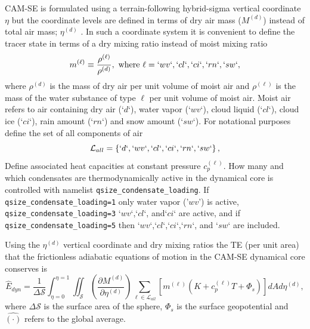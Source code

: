 \documentclass{agujournal}
\newcommand*{\gi}[1]{\widehat{#1}}
\begin{document}
CAM-SE is formulated using a terrain-following hybrid-sigma vertical coordinate $\eta$ but the coordinate levels are defined in terms of dry air mass ($M^{(d)}$) instead of total air mass; $\eta^{(d)}$ \citep[see ][ for details]{LetAl2018JAMES}. In such a coordinate system it is convenient to define the tracer state in terms of a dry mixing ratio instead of moist mixing ratio
\begin{equation}
m^{(\ell)}\equiv \frac{\rho^{(\ell)}}{\rho^{(d)}}, \text{ where }\ell=`wv`,`cl`,`ci`,`rn`,`sw`,\label{eq:mx}
\end{equation}
where $\rho^{(d)}$ is the mass of dry air per unit volume of moist air and $\rho^{(\ell)}$ is the mass of the water substance of type $\ell$ per unit volume of moist air. Moist air refers to air containing dry air (`$d$`), water vapor (`$wv$`), cloud liquid (`$cl$`), cloud ice (`$ci$`), rain amount (`$rn$`) and snow amount (`$sw$`). For notational purposes define the set of all components of air
\begin{equation}
\mathcal{L}_{all}=\left\{ `d`,`wv`,`cl`,`ci`,`rn`,`sw`\right\},
\end{equation}
Define associated heat capacities at constant pressure $c_p^{(\ell)}$. How many and which condensates are thermodynamically active in the dynamical core is controlled with namelist {\tt{qsize\_condensate\_loading}}. If {\tt{qsize\_condensate\_loading=1}} only water vapor ('$wv$') is active, {\tt{qsize\_condensate\_loading=3}} `$wv$`,`$cl$`, and`$ci$` are active, and if {\tt{qsize\_condensate\_loading=5}} then `$wv$`,`$cl$`,`$ci$`,`$rn$`, and `$sw$` are included.

Using the $\eta^{(d)}$ vertical coordinate and dry mixing ratios the TE (per unit area) that the frictionless adiabatic equations of motion in the CAM-SE dynamical core conserves is
\begin{equation}
\gi{E}_{dyn}=\frac{1}{\Delta \mathcal{S}}\int_{\eta=0}^{\eta=1} \iint_\mathcal{S} \left( \frac{\partial M^{(d)}}{\partial \eta^{(d)}} \right)\sum_{\ell \in \mathcal{L}_{all}} \left[m^{(\ell)} \left(K+c_p^{(\ell)}T+\Phi_s  \right)\right]  dA d \eta^{(d)},\label{eq:comprehensice_energy}
\end{equation}
where $\Delta \mathcal{S}$ is the surface area of the sphere, $\Phi_s$ is the surface geopotential and $\gi{(\cdot)}$ refers to the global average.
\end{document}
